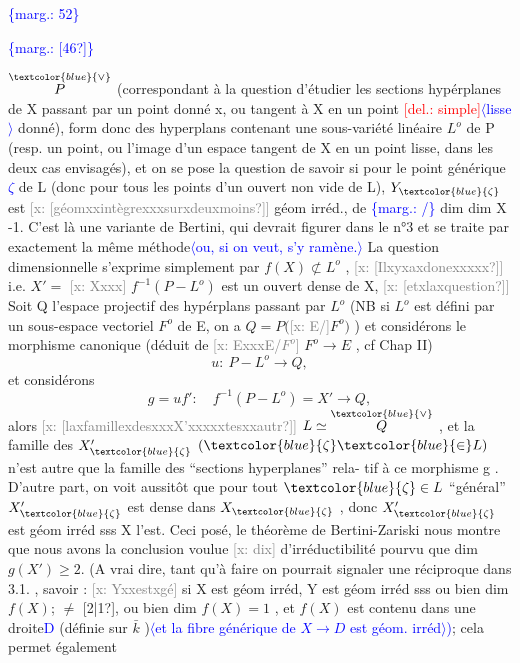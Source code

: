 \documentclass[11pt]{article}
\newcommand{\scanpage}[1]{\par\bigskip\noindent{\small\sffamily[scan #1]}\par}
\newcommand{\hand}[1]{\textcolor{blue}{#1}}
\let\over\relax
\newcommand{\over}[2]{\textcolor{gray}{#1}\textcolor{blue}{\ensuremath{^{\!\nearrow}}#2}}
\newcommand{\inserted}[2][]{\textcolor{blue}{$\langle$#2$\rangle$}}
\newcommand{\margin}[1]{\textcolor{blue}{\{\textsf{marg.:} #1\}}}
\newcommand{\deleted}[1]{\textcolor{red}{[\textsf{del.:} #1]}}
\newcommand{\xout}[1]{\textcolor{gray}{[\textsf{x:} #1]}}
\newcommand{\unsure}[1]{[#1?]}
\begin{document}
\margin{52}

\clearpage
\scanpage{25/53}
\margin{\unsure{46}}

$\overset{\hand{\vee}}{P}$ (correspondant à la question d'étudier les sections hypérplanes de X
passant par un point donné x, ou tangent à X en un point \deleted{simple}\inserted{lisse} donné),
form\over{e}{é} donc des hyperplans contenant une sous-variété linéaire $L^{o}$ de P
(resp. un point,  ou l'image d'un espace tangent de X en un point lisse,
dans les deux cas envisagés), et on se pose la question de savoir si
pour le point générique \hand{$\zeta$} de L  (donc pour tous les points d'un ouvert
non vide de L),  $Y_{\hand{\zeta}}$  est \xout{\unsure{géomxxintègrexxxsurxdeuxmoins}} géom irréd., de
\margin{/} dim  dim X -1.   C'est là une variante  de Bertini, qui devrait figurer
dans  le n°3  et se traite par exactement la même méthode\inserted[typed]{ou, si on veut, s'y ramène.}  La question
dimensionnelle s'exprime simplement par  $f(X)\not\subset L^{o}$ , \xout{\unsure{Ilxyxaxdonexxxxx}}
i.e.  $X' =$ \xout{Xxxx} $f^{-1}(P - L^{o})$   est un ouvert dense de X, \xout{\unsure{etxlaxquestion}}
Soit Q l'espace projectif des hypérplans passant par $L^{o}$  (NB si  $L^{o}$ est
défini par un sous-espace vectoriel $F^{o}$ de E,  on a   $Q = P($\xout{E/}$F^{o})$ ) et
considérons le morphisme  canonique  (déduit de \xout{ExxxE/$F^{o}$} $F^{o}\longrightarrow E$ , cf
Chap II)
\[ u :\ P - L^{o} \longrightarrow Q, \]
et considérons
\[ g = u f' :\quad f^{-1}(P - L^{o}) = X' \longrightarrow Q , \]
alors \xout{\unsure{laxfamillexdesxxxX'xxxxxtesxxautr}}  $L \simeq \overset{\hand{\vee}}{Q}$ ,  et la famille des
$X'_{\hand{\zeta}}$  $(\hand{\zeta}\hand{\in} L)$  n'est autre que la famille des ``sections hyperplanes'' rela-%
tif à ce morphisme  g . D'autre part, on voit aussitôt que pour tout
$\hand{\zeta}\in L$  ``général''  $X'_{\hand{\zeta}}$ est dense dans $X_{\hand{\zeta}}$ , donc  $X'_{\hand{\zeta}}$  est géom irréd sss
X  l'est.  Ceci posé,  le théorème de Bertini-Zariski nous montre que
nous avons la conclusion voulue \xout{dix} d'irréductibilité pourvu que
dim $g(X') \geqslant 2$. (A vrai dire, tant qu'à faire on pourrait signaler une
réciproque dans 3.1. , savoir : \xout{Yxxestxgé} si X est géom irréd, Y  est
géom irréd sss  ou bien  dim $f(X)$; $\neq$ \unsure{2|1}, ou bien  dim $f(X)=1$ , et $f(X)$
est contenu dans une droite\hand{D} (définie sur $\bar{k}$ )\inserted{et la fibre générique de $X\to D$ est géom. irréd}\hand{)}; cela permet également
\end{document}
